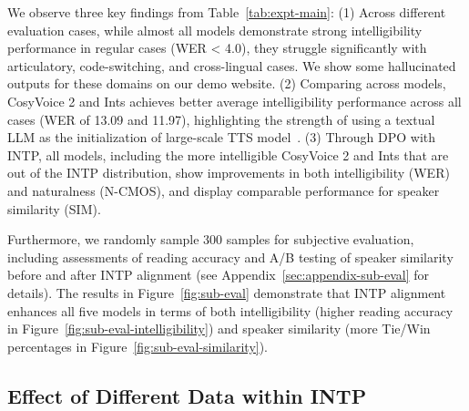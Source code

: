 \documentclass[11pt]{article}
\begin{document}
We observe three key findings from Table~\ref{tab:expt-main}: (1) Across different evaluation cases, while almost all models demonstrate strong intelligibility performance in regular cases (WER < 4.0), they struggle significantly with articulatory, code-switching, and cross-lingual cases. We show some hallucinated outputs for these domains on our demo website. (2) Comparing across models, CosyVoice 2 and Ints achieves better average intelligibility performance across all cases (WER of 13.09 and 11.97), highlighting the strength of using a textual LLM as the initialization of large-scale TTS model~\cite{cosyvoice2}. (3) Through DPO with INTP, all models, including the more intelligible CosyVoice 2 and Ints that are out of the INTP distribution, show improvements in both intelligibility (WER) and naturalness (N-CMOS), and display comparable performance for speaker similarity (SIM). 

Furthermore, we randomly sample 300 samples for subjective evaluation, including assessments of reading accuracy and A/B testing of speaker similarity before and after INTP alignment (see Appendix~\ref{sec:appendix-sub-eval} for details). The results in Figure~\ref{fig:sub-eval} demonstrate that INTP alignment enhances all five models in terms of both intelligibility (higher reading accuracy in Figure~\ref{fig:sub-eval-intelligibility}) and speaker similarity (more Tie/Win percentages in Figure~\ref{fig:sub-eval-similarity}).


\subsection{Effect of Different Data within INTP}
\end{document}
